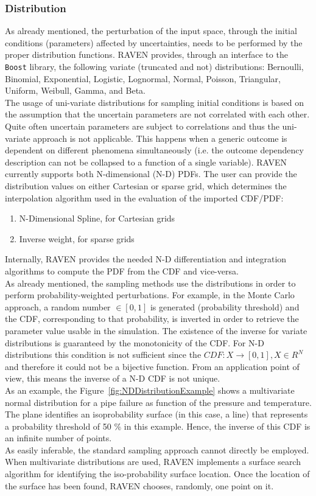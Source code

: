 \subsubsection{Distribution}
As already mentioned, the perturbation of the input space, through the initial conditions (parameters) affected by uncertainties, needs to be performed by the proper distribution functions. RAVEN provides, through an interface to the \texttt{Boost} library, the following variate (truncated and not) distributions: Bernoulli, Binomial, Exponential, Logistic, Lognormal, Normal, Poisson, Triangular, Uniform, Weibull, Gamma, and Beta.
\\The usage of uni-variate distributions for sampling initial conditions is based on the assumption that the uncertain parameters are not correlated with each other. Quite often uncertain parameters are subject to correlations and thus the uni-variate approach is not applicable. This happens when a generic outcome is dependent on different phenomena simultaneously (i.e. the outcome dependency description can not be collapsed to a function of a single variable). RAVEN currently supports both N-dimensional (N-D) PDFs. The user can provide the distribution values on either Cartesian or sparse grid, which determines the interpolation algorithm used in the evaluation of the imported CDF/PDF:
\begin{enumerate}
\item N-Dimensional Spline, for Cartesian grids
\item Inverse weight, for sparse grids
\end{enumerate}
Internally, RAVEN provides the needed N-D differentiation and integration algorithms to compute the PDF from the CDF and vice-versa. 
\\As already mentioned, the sampling methods use the distributions in order to perform probability-weighted perturbations. For example, in the Monte Carlo approach, a random number $\in [0,1]$ is generated (probability threshold) and the CDF, corresponding to that probability, is inverted in order to retrieve the parameter value usable in the simulation. The existence of the inverse for variate distributions is guaranteed by the monotonicity of the CDF. For N-D distributions this condition is not sufficient since the $CDF:X\longrightarrow [0,1],X \in  R^{N} $ and therefore it could not be a bijective function. From an application point of view, this means the inverse of a N-D CDF is not unique. 
\\As an example, the Figure~\ref{fig:NDDistributionExample} shows a multivariate normal distribution for a pipe failure as function of the pressure and temperature. The plane identifies an isoprobability surface (in this case, a line) that represents a probability threshold of 50 \% in this example.  Hence, the inverse of this CDF is an infinite number of points.
 \\As easily inferable, the standard sampling approach cannot directly be employed. When multivariate distributions are used, RAVEN implements a surface search algorithm for identifying the iso-probability surface location. Once the location of the surface has been found, RAVEN chooses, randomly, one point on it.

